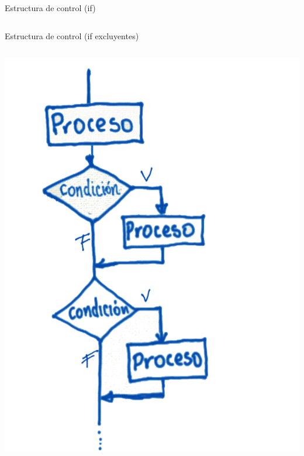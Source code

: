 \documentclass[presentation, aspectratio=54]{beamer}
\begin{document}
\begin{frame}[label={sec:orgfb8e82e}]{Estructura de control (if)}
\begin{columns}
\begin{column}{0.6\columnwidth}
\begin{center}
\end{center}
\end{column}
\end{columns}
\end{frame}


\begin{frame}[label={sec:org5afb780}]{Estructura de control (if excluyentes)}
\begin{columns}
\begin{column}{0.4\columnwidth}
\begin{center}
\includegraphics[width=.9\linewidth]{./images/codigo/ifexcluyentes.png}
\end{center}
\end{column}


\end{columns}
\end{frame}
\end{document}
